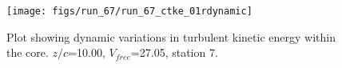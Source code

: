 \begin{figure}[H]
\centering
\texttt{[image: figs/run\_67/run\_67\_ctke\_01rdynamic]}
\caption{Plot showing dynamic variations in turbulent kinetic energy within the core. $z/c$=10.00, $V_{free}$=27.05, station 7.}
\label{fig:run_67_ctke_01rdynamic}
\end{figure}


